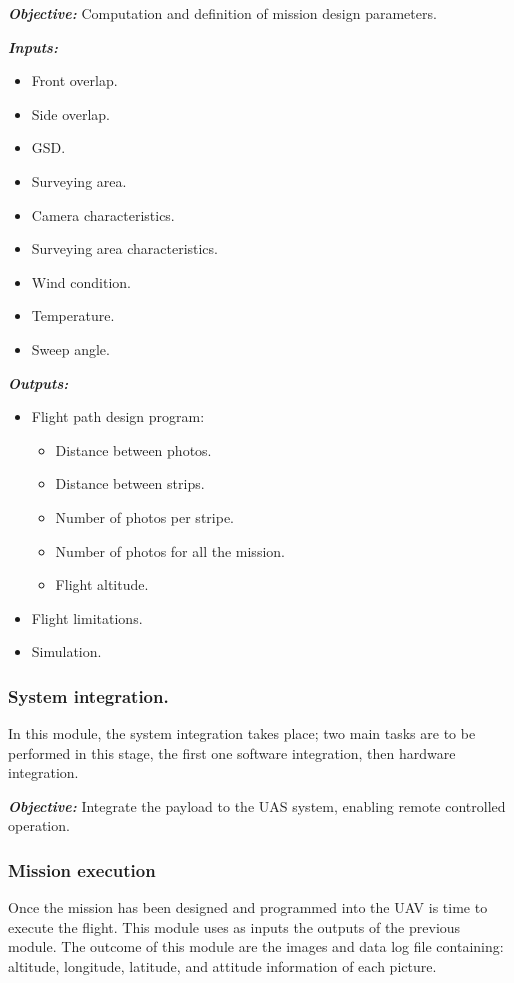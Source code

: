 \textit{\textbf{Objective:}} Computation and definition of mission design parameters.

\textit{\textbf{Inputs:}} 
\begin{itemize}
    \item Front overlap.
    \item Side overlap.
    \item GSD.
    \item Surveying area.
    \item Camera characteristics.
    \item Surveying area characteristics.
    \item Wind condition.
    \item Temperature.
    \item Sweep angle.
\end{itemize}

\textit{\textbf{Outputs:}} 
\begin{itemize}
    \item Flight path design program:\begin{itemize}
        \item Distance between photos.
        \item Distance between strips.
        \item Number of photos per stripe.
        \item Number of photos for all the mission.
        \item Flight altitude.
    \end{itemize}
    \item Flight limitations.
    \item Simulation.
\end{itemize}
\subsubsection{System integration.}
In this module, the system integration takes place; two main tasks are to be performed in this stage, the first one software integration, then hardware integration.


\textit{\textbf{Objective:}} Integrate the payload to the UAS system, enabling remote controlled operation.

\subsubsection{Mission execution}
Once the mission has been designed and programmed into the UAV is time to execute the flight. This module uses as inputs the outputs of the previous module. The outcome of this module are the images and data log file containing: altitude, longitude, latitude, and attitude information of each picture.

